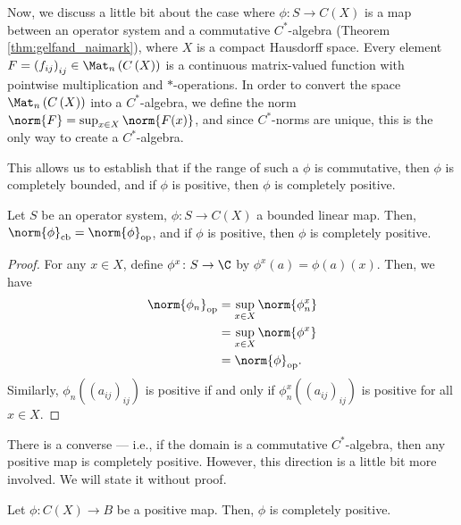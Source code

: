 Now, we discuss a little bit about the case where $\phi\colon S\rightarrow C\left( X \right)$ is a map between an operator system and a commutative $C^{\ast}$-algebra (Theorem \ref{thm:gelfand_naimark}), where $X$ is a compact Hausdorff space. Every element $F = \left( f_{ij} \right)_{ij}\in \Mat_n\left( C\left( X \right) \right)$ is a continuous matrix-valued function with pointwise multiplication and $\ast$-operations. In order to convert the space $\Mat_n\left( C\left( X \right) \right)$ into a $C^{\ast}$-algebra, we define the norm $\norm{F} = \sup_{x\in X}\norm{F(x)}$, and since $C^{\ast}$-norms are unique, this is the only way to create a $C^{\ast}$-algebra.\newline

This allows us to establish that if the range of such a $\phi$ is commutative, then $\phi$ is completely bounded, and if $\phi$ is positive, then $\phi$ is completely positive.
\begin{theorem}\label{thm:commutative_range_completely_positive}
  Let $S$ be an operator system, $\phi\colon S\rightarrow C(X)$ a bounded linear map. Then, $\norm{\phi}_{\cb} = \norm{\phi}_{\op}$, and if $\phi$ is positive, then $\phi$ is completely positive.
\end{theorem}
\begin{proof}
  For any $x\in X$, define $\phi^{x}\colon S\rightarrow \C$ by $\phi^x(a) = \phi(a)(x)$. Then, we have
  \begin{align*}
    \norm{\phi_n}_{\op} &= \sup_{x\in X}\norm{\phi_n^{x}}\\
                        &= \sup_{x\in X}\norm{\phi^{x}}\\
                        &= \norm{\phi}_{\op}.
  \end{align*}
  Similarly, $\phi_n\left( \left( a_{ij} \right)_{ij} \right)$ is positive if and only if $\phi_n^{x}\left( \left( a_{ij} \right)_{ij} \right)$ is positive for all $x\in X$.
\end{proof}
\begin{remark}
  There is a converse --- i.e., if the domain is a commutative $C^{\ast}$-algebra, then any positive map is completely positive. However, this direction is a little bit more involved. We will state it without proof.
\end{remark}
\begin{theorem}\label{thm:commutative_domain_completely_positive}
  Let $\phi\colon C\left( X \right)\rightarrow B$ be a positive map. Then, $\phi$ is completely positive.
\end{theorem}
